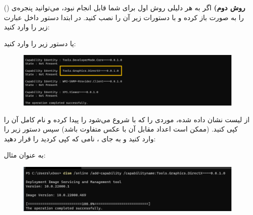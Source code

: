 {\begin{spacing}{1.5}
        \textbf{روش دوم)}
        اگر به هر دلیلی روش اول برای شما قابل انجام نبود، می‌توانید پنجره‌ی  () را به صورت  باز کرده و با دستورات زیر آن را نصب کنید.
        در ابتدا دستور داخل  عبارت زیر را وارد کنید:

        \begin{flushleft}
        \end{flushleft}

        یا دستور زیر را وارد کنید:

        \begin{flushleft}
        \end{flushleft}

        \begin{figure}[H]
            \centering
            \setlength{\belowcaptionskip}{-10pt}
            \includegraphics[width=\textwidth]{Images/3/3.Intro.4.3}
            \caption*{}
        \end{figure}

        از لیست نشان داده شده، موردی را که با  شروع می‌شود را پیدا کرده و نام کامل آن را کپی کنید. (ممکن است اعداد مقابل آن با عکس متفاوت باشد)
        سپس دستور زیر را وارد کنید و به جای ، نامی که کپی کردید را قرار دهید:

        \begin{flushleft}
        \end{flushleft}

        به عنوان مثال:

        \begin{flushleft}
            \normalsize
        \end{flushleft}

        \begin{figure}[H]
            \centering
            \setlength{\belowcaptionskip}{-10pt}
            \includegraphics[width=\textwidth]{Images/3/3.Intro.4.4}
            \caption*{}
        \end{figure}


\end{spacing}}
